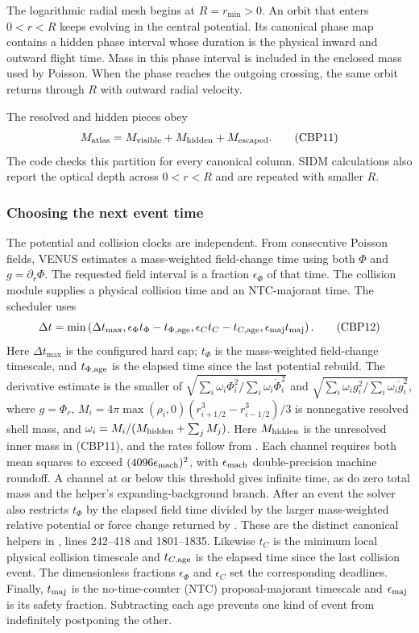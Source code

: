 The logarithmic radial mesh begins at \(R=r_{\min}>0\).  An orbit that enters
\(0<r<R\) keeps evolving in the central potential.  Its canonical phase map
contains a hidden phase interval whose duration is the physical inward and
outward flight time.  Mass in this phase interval is included in the enclosed
mass used by Poisson.  When the phase reaches the outgoing crossing, the same
orbit returns through \(R\) with outward radial velocity.

The resolved and hidden pieces obey
\[
 M_{\rm atlas}=M_{\rm visible}+M_{\rm hidden}+M_{\rm escaped}. \tag{CBP11}
\]
The code checks this partition for every canonical column.  SIDM calculations
also report the optical depth across \(0<r<R\) and are repeated with smaller
\(R\).

\subsubsection{Choosing the next event time}

The potential and collision clocks are independent.  From consecutive
Poisson fields, VENUS estimates a mass-weighted field-change time using both
\(\Phi\) and \(g=\partial_r\Phi\).  The requested field interval is a fraction
\(\epsilon_\Phi\) of that time.  The collision module supplies a physical
collision time and an NTC-majorant time.  The scheduler uses
\[
 \Delta t=\min\left(
  \Delta t_{\max},
  \epsilon_\Phi t_\Phi-t_{\Phi,{\rm age}},
  \epsilon_C t_C-t_{C,{\rm age}},
  \epsilon_{\rm maj}t_{\rm maj}
 \right).                                               \tag{CBP12}
\]
Here \(\Delta t_{\max}\) is the configured hard cap;
\(t_\Phi\) is the mass-weighted field-change timescale, and
\(t_{\Phi,{\rm age}}\) is the elapsed time since the last potential rebuild.
The derivative estimate is the smaller of
\(\sqrt{\sum_i\omega_i\Phi_i^2/\sum_i\omega_i\dot\Phi_i^2}\) and
\(\sqrt{\sum_i\omega_i g_i^2/\sum_i\omega_i\dot g_i^2}\), where
\(g=\Phi_r\), \(M_i=4\pi\max(\rho_i,0)
(r_{i+1/2}^3-r_{i-1/2}^3)/3\) is nonnegative resolved shell mass, and
\(\omega_i=M_i/(M_{\rm hidden}+\sum_jM_j)\).
Here \(M_{\rm hidden}\) is the unresolved inner mass in (CBP11), and the
rates follow from .  Each channel requires
both mean squares to exceed \((4096\epsilon_{\rm mach})^2\), with
\(\epsilon_{\rm mach}\) double-precision machine roundoff. A channel at or
below this threshold gives infinite time, as do zero total mass and the
helper's expanding-background branch.
After an event the solver also restricts \(t_\Phi\) by the elapsed field time
divided by the larger mass-weighted relative potential or force change
returned by .  These are the distinct
canonical helpers in ,
lines 242--418 and 1801--1835.
Likewise \(t_C\) is the minimum local physical
collision timescale and \(t_{C,{\rm age}}\) is the elapsed time since the
last collision event.  The dimensionless fractions \(\epsilon_\Phi\) and
\(\epsilon_C\) set the corresponding deadlines.  Finally,
\(t_{\rm maj}\) is the no-time-counter (NTC) proposal-majorant timescale and
\(\epsilon_{\rm maj}\) is its safety fraction.  Subtracting each age prevents
one kind of event from indefinitely postponing the other.

